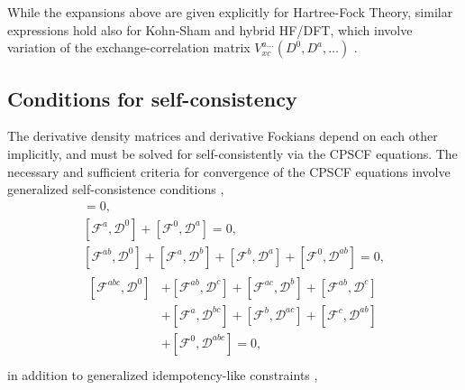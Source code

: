 \documentclass[prl,aps,preprint,showpacs,superbib]{revtex4}
\def\F{\mathcal{F}}
\def\D{\mathcal{D}}
\begin{document}
While the expansions above are given explicitly for Hartree-Fock Theory, similar expressions 
hold also for Kohn-Sham and hybrid HF/DFT,  which involve variation of the  exchange-correlation 
matrix $V_{xc}^{a\ldots}(D^0,D^a,\ldots)$ \cite{Lee_1994,PSalek02}.

\subsection{Conditions for self-consistency}\label{SelfConsistency}

The derivative density matrices and derivative Fockians depend on 
each other implicitly, and must be solved for self-consistently
via the CPSCF equations.
The necessary and sufficient criteria for convergence of the 
CPSCF equations involve generalized self-consistence conditions \cite{Furche_2001},
\begin{gather}
    [\F^{0} ,\D^{0}]=0,\label{eq:commutators1}\\
    [\F^{a} ,\D^{0}]+[\F^{0},\D^{a}]=0,\label{eq:commutators2}\\
    [\F^{ab},\D^{0}]+[\F^{a},\D^{b}]+[\F^{b},\D^{a}]+[\F^{0},\D^{ab}]=0,\label{eq:commutators3}\\
  \begin{split}
    [\F^{abc},\D^{0}]&+[\F^{ab},\D^{c}]+[\F^{ac},\D^{b}]+[\F^{ab},\D^{c}]\\
    &+[\F^{a},\D^{bc}]+[\F^{b},\D^{ac}]+[\F^{c},\D^{ab}]\\
    &+[\F^{0},\D^{abc}]=0,\label{eq:commutators4}\\
  \end{split}
\end{gather}
in addition to generalized idempotency-like constraints \cite{Furche_2001},
\end{document}

